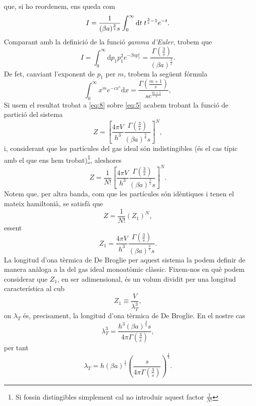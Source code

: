 \documentclass[a4paper, 10pt]{article}
\begin{document}
que, si ho reordenem, ens queda com
\begin{equation}
	I = \frac{1}{(\beta a)^\frac{3}{s}s} \int_0^{\infty}\mathrm{d}t \hspace{0.1cm} t^{\frac{3}{s}-1}e^{-t}.
\end{equation}
Comparant amb la definició de la funció \textit{gamma d'Euler}, trobem que
\begin{equation}
	I = \int_0^\infty \mathrm{d}p_1 p_1^2e^{-\beta a p_1^s} = \frac{\Gamma(\frac{3}{s})}{(\beta a)^{\frac{3}{s}}}.\label{eq:8}
\end{equation}
De fet, canviant l'exponent de $p_1$ per $m$, trobem la següent fórmula
\begin{equation}
	\int_0^\infty x^m e^{-cx^s}\mathrm{d}x = \frac{\Gamma(\frac{m+1}{s})}{sc^{\frac{m+1}{s}}},
\end{equation}
Si usem el resultat trobat a \eqref{eq:8} sobre \eqref{eq:5} acabem trobant la funció de partició del sistema
\begin{equation}
	Z = \left[\frac{4\pi V}{h^3} \frac{\Gamma(\frac{3}{s})}{(\beta a )^\frac{3}{s}s}\right]^N,
\end{equation}
i, considerant que les partícules del gas ideal són indistingibles (és el cas típic amb el que ens hem trobat)\footnote{Si fossin distingibles simplement cal no introduir aquest factor $\frac{1}{N!}$}, aleshores
\begin{equation}
	\boxed{Z = \frac{1}{N!}\left[\frac{4\pi V}{h^3} \frac{\Gamma(\frac{3}{s})}{(\beta a )^\frac{3}{s}s}\right]^N}. \label{eq:11}
\end{equation}
Notem que, per altra banda, com que les partícules són idèntiques i tenen el mateix hamiltonià, se satisfà que
\begin{equation}
	Z = \frac{1}{N!}(Z_1)^N,
\end{equation}
essent
\begin{equation}
	Z_1 = \frac{4\pi V}{h^3} \frac{\Gamma(\frac{3}{s})}{(\beta a )^\frac{3}{s}s}.
\end{equation}
La longitud d'ona tèrmica de De Broglie per aquest sistema la podem definir de manera anàloga a la del gas ideal monoatòmic clàssic. Fixem-nos en què podem considerar que $Z_1$, en ser adimensional, és un volum dividit per una longitud característica al cub
\begin{equation}
	Z_1 \equiv \frac{V}{\lambda_T^3},
\end{equation}
on $\lambda_T$ és, precisament, la longitud d'ona tèrmica de De Broglie. En el nostre cas
\begin{equation*}
	\lambda_T^3 = \frac{h^3 (\beta a)^{\frac{3}{s}}s}{4\pi \Gamma(\frac{3}{s})},
\end{equation*}
per tant
\begin{equation}
	\boxed{\lambda_T = h(\beta a)^\frac{1}{s}\left(\frac{s}{4\pi \Gamma(\frac{3}{s})}\right)^{\frac{1}{3}}}. \label{eq:15}
\end{equation}
\end{document}
